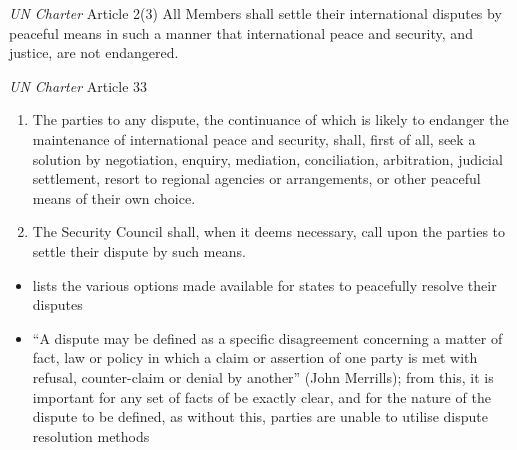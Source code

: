 \begin{conventiondetails}{\textit{UN Charter} Article 2(3)}
    \flushleft
    All Members shall settle their international disputes by peaceful means in such a manner that international peace and security, and justice, are not endangered.
\end{conventiondetails}

\begin{conventiondetails}{\textit{UN Charter} Article 33}
    \flushleft
    \begin{enumerate}
        \item The parties to any dispute, the continuance of which is likely to endanger the maintenance of international peace and security, shall, first of all, seek a solution by negotiation, enquiry, mediation, conciliation, arbitration, judicial settlement, resort to regional agencies or arrangements, or other peaceful means of their own choice.
        \item The Security Council shall, when it deems necessary, call upon the parties to settle their dispute by such means.
    \end{enumerate}
\end{conventiondetails}

\begin{itemize}
    \item {} lists the various options made available for states to peacefully resolve their disputes
    \item ``A dispute may be defined as a specific disagreement concerning a matter of fact, law or policy in which a claim or assertion of one party is met with refusal, counter-claim or denial by another'' (John Merrills); from this, it is important for any set of facts of be exactly clear, and for the nature of the dispute to be defined, as without this, parties are unable to utilise dispute resolution methods
\end{itemize}

